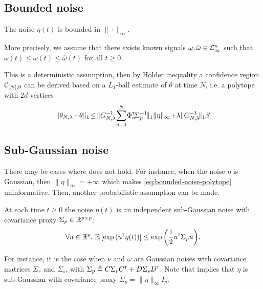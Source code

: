 \subsection{Bounded noise}

\begin{assumption}
\label{assumpt:bounded-noise}
\begin{leftbar}[assumptionbar]
The noise $\eta(t)$ is bounded in $\|\cdot\|_\infty$.
	
More precisely, we assume that there exists known signals $\underline{\omega},\overline{\omega}\in\mathcal{L}_{\infty}^{n}$ such that $\underline{\omega}(t)\leq \omega(t)\leq\overline{\omega}(t)$ for all $t\geq0$.
\end{leftbar}
\end{assumption}

This is a deterministic assumption, then by Hölder inequality a confidence region $\mathcal{C}_{[N],0}$ can be derived based on a $L_1$-ball estimate of $\theta$ at time $N$, i.e. a polytope with $2d$ vertices
\begin{equation}
\label{eq:bounded-noise-polytope}
\|\theta_{N,\lambda}\! -\! \theta\|_1\! \leq \! \|G_{N, \lambda}^{-1}\!\sum_{n=1}^N \!\Phi_n^\transp\! \Sigma_p^{-1}\!\|_1\|\eta\|_\infty\! +\!\lambda\|G_{N, \lambda}^{-1}\!\|_1S
\end{equation}

\subsection{Sub-Gaussian noise}

There may be cases where  does not hold. For instance, when the noise $\eta$ is Gaussian, then $\|\eta\|_\infty=+\infty$ which makes \eqref{eq:bounded-noise-polytope} uninformative. Then, another probabilistic assumption can be made.

\begin{assumption}
	\label{assumpt:gaussian-noise}
	\begin{leftbar}[assumptionbar]
	At each time $t\geq0$ the noise $\eta(t)$ is an independent sub-Gaussian noise with covariance proxy $\Sigma_p \in \mathbb{R}^{p\times p}$:
	\begin{equation*}
	\forall u\in\mathbb{R}^p,\, \operatorname*{\mathbb{E}} \left[ \exp{\left( u^{\mathsf{\scriptscriptstyle T}}\eta(t)\right)}\right] \leq \exp{\left( \frac{1}{2} u^{\mathsf{\scriptscriptstyle T}}\Sigma_p u\right)}.
	\end{equation*}
	\end{leftbar}
\end{assumption}
For instance, it is the case when $\nu$ and $\omega$ are Gaussian noises with covariance matrices $\Sigma_r$ and $\Sigma_s$, with $\Sigma_p \eqdef C\Sigma_r C^\transp + D\Sigma_s D^\transp$. Note that  implies that $\eta$ is sub-Gaussian with covariance proxy $\Sigma_p=\|\eta\|_\infty I_p$.

